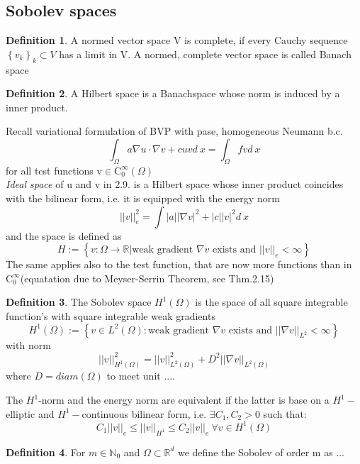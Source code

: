 \documentclass[english]{article}
\theoremstyle{definition}
\newtheorem*{defi}{Definition}
\theoremstyle{remark}
\newcommand{\NN}{\mathbb{N}}			%
\newcommand{\RR}{\mathbb{R}}			%
\newcommand{\OO}{\Omega}
\newcommand{\cinf}{\tx{C}^\infty}
\newcommand{\tri}{\nabla}
\newcommand{\tx}[1]{\text{#1}}
\begin{document}
  \subsection{Sobolev spaces}
  \begin{defi}
    A normed vector space V is complete, if every Cauchy sequence $\left\{ v_k \right\}_k \subset V$ has a limit in V. A normed, complete vector space is called Banach space\end{defi}
  \begin{defi}
    A Hilbert space is a Banachspace whose norm is induced by a inner product.\end{defi}
  Recall variational formulation of BVP with pase, homogeneous Neumann b.c.
  $$\int_\OO a \tri u \cdot \tri v + cuv d\ x = \int_\OO fv d\ x$$
  for all test functions v$\in \cinf _0(\OO)$\\
  \emph{Ideal space} of u and v in 2.9. is a Hilbert space whose inner product coincides with the bilinear form, i.e. it is equipped with the energy norm
  $$||v||_e ^2 = \int |a||\tri v |^2 +|c||v|^2 d\ x $$
  and the space is defined as 
  $$ H:= \left\{v : \OO \to \RR | \tx{weak gradient }\tri v \tx{ exists and } ||v||_e <\infty \right\}$$
  The same applies also to the test function, that are now more functions than in $\cinf_0$(equatation due to Meyser-Serrin Theorem, see Thm.2.15)
  \begin{defi}
    The Sobolev space $H^1(\OO)$ is the space of all square integrable function's with square integrable weak gradients
    $$H^1(\OO) := \left\{v\in L^2(\OO) : \tx{weak gradient }\tri v \tx{ exists and } ||\tri v||_{L^2} <\infty \right\}$$
    with norm $$||v||^2 _{H^1(\OO)} = ||v||^2 _{L^2(\OO)} + D^2 ||\tri v||_{L^2(\OO)}$$
    where $D= diam (\OO)$ to meet unit ....


    The $H^1$-norm and the energy norm are equivalent if the latter is base on a $H^1-$elliptic and $H^1-$continuous bilinear form, i.e. $\exists C_1,C_2>0$ such that:
    $$C_1 ||v||_e \leq ||v||_{H^1 }\leq C_2||v||_e \ \forall v \in H^1(\OO)$$
  \end{defi}
  \begin{defi} For $m \in \NN_0$ and $\OO\subset \RR^d$ we define the Sobolev of order m as ...
  \end{defi}
\end{document}
